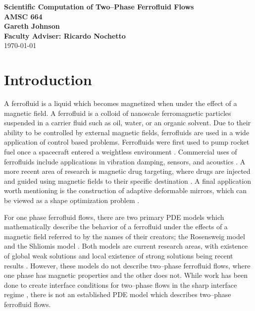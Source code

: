\documentclass[11pt,fullpage]{article}
\theoremstyle{lemma}
\theoremstyle{definition}
\theoremstyle{lemma}
\begin{document}
	
\begin{center}
	\textbf{\Large{Scientific Computation of Two--Phase Ferrofluid Flows}}
	\\
	\textbf{\Large{AMSC 664}} \\ 
	\textbf{\large{Gareth Johnson}}\\
	\textbf{\large{Faculty Adviser: Ricardo Nochetto}}
	\\
	\today
\end{center}

\section{Introduction}
A ferrofluid is a liquid which becomes magnetized when under the effect of a magnetic field. A ferrofluid is a colloid of nanoscale ferromagnetic particles suspended in a carrier fluid such as oil, water, or an organic solvent. Due to their ability to be controlled by external magnetic fields, ferrofluids are used in a wide application of control based problems. Ferrofluids were first used to pump rocket fuel once a spacecraft entered a weightless environment \cite{Rocket}. Commercial uses of ferrofluids include applications in vibration damping, sensors, and acoustics \cite{CommercialAppl}. A more recent area of research is magnetic drug targeting, where drugs are injected and guided using magnetic fields to their specific destination \cite{DrugTarg:1, DrugTarg:2, DrugTarg:3}. A final application worth mentioning is the construction of adaptive deformable mirrors, which can be viewed as a shape optimization problem \cite{FerroMirror:1, FerroMirror:2, FerroMirror:3}. 

For one phase ferrofluid flows, there are two primary PDE models which mathematically describe the behavior of a ferrofluid under the effects of a magnetic field referred to by the names of their creators; the Rosensweig model \cite{Rosensweig} and the Shliomis model \cite{Shliomis}. Both models are current research areas, with existence of global weak solutions and local existence of strong solutions being recent results \cite{PDEResults:1,PDEResults:2, PDEResults:3, PDEResults:4}. However, these models do not describe two--phase ferrofluid flows, where one phase has magnetic properties and the other does not. While work has been done to create interface conditions for two--phase flows in the sharp interface regime \cite{SharpInter:1, SharpInter:2}, there is not an established PDE model which describes two--phase ferrofluid flows.
\end{document}
